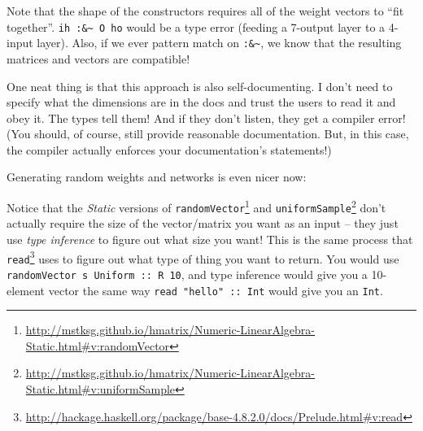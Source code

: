\documentclass[]{article}
\newenvironment{Shaded}{}{}
\newcommand{\CommentTok}[1]{\textcolor[rgb]{0.38,0.63,0.69}{\textit{#1}}}
\newcommand{\DataTypeTok}[1]{\textcolor[rgb]{0.56,0.13,0.00}{#1}}
\newcommand{\DecValTok}[1]{\textcolor[rgb]{0.25,0.63,0.44}{#1}}
\newcommand{\FunctionTok}[1]{\textcolor[rgb]{0.02,0.16,0.49}{#1}}
\newcommand{\KeywordTok}[1]{\textcolor[rgb]{0.00,0.44,0.13}{\textbf{#1}}}
\newcommand{\NormalTok}[1]{#1}
\newcommand{\OperatorTok}[1]{\textcolor[rgb]{0.40,0.40,0.40}{#1}}
\newcommand{\OtherTok}[1]{\textcolor[rgb]{0.00,0.44,0.13}{#1}}
\renewcommand{\href}[2]{#2\footnote{\url{#1}}}
\begin{document}
Note that the shape of the constructors requires all of the weight vectors to
``fit together''. \texttt{ih\ :\&\textasciitilde{}\ O\ ho} would be a type error
(feeding a 7-output layer to a 4-input layer). Also, if we ever pattern match on
\texttt{:\&\textasciitilde{}}, we know that the resulting matrices and vectors
are compatible!

One neat thing is that this approach is also self-documenting. I don't need to
specify what the dimensions are in the docs and trust the users to read it and
obey it. The types tell them! And if they don't listen, they get a compiler
error! (You should, of course, still provide reasonable documentation. But, in
this case, the compiler actually enforces your documentation's statements!)

Generating random weights and networks is even nicer now:

\begin{Shaded}
\end{Shaded}

Notice that the \emph{Static} versions of
\href{http://mstksg.github.io/hmatrix/Numeric-LinearAlgebra-Static.html\#v:randomVector}{\texttt{randomVector}}
and
\href{http://mstksg.github.io/hmatrix/Numeric-LinearAlgebra-Static.html\#v:uniformSample}{\texttt{uniformSample}}
don't actually require the size of the vector/matrix you want as an input --
they just use \emph{type inference} to figure out what size you want! This is
the same process that
\href{http://hackage.haskell.org/package/base-4.8.2.0/docs/Prelude.html\#v:read}{\texttt{read}}
uses to figure out what type of thing you want to return. You would use
\texttt{randomVector\ s\ Uniform\ ::\ R\ 10}, and type inference would give you
a 10-element vector the same way \texttt{read\ "hello"\ ::\ Int} would give you
an \texttt{Int}.
\end{document}
